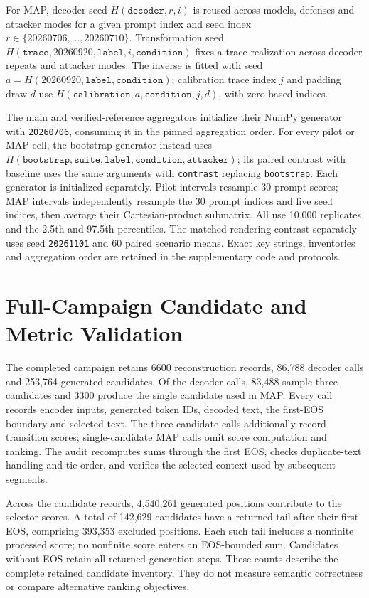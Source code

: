 \documentclass[electronics,article,submit,pdftex,moreauthors]{Definitions/mdpi}
\begin{document}
For MAP, decoder seed $H(\texttt{decoder},r,i)$ is reused across models, defenses and attacker modes for a given prompt index and seed index $r\in\{20260706,\ldots,20260710\}$. Transformation seed $H(\texttt{trace},20260920,\texttt{label},i,\texttt{condition})$ fixes a trace realization across decoder repeats and attacker modes. The inverse is fitted with seed $a=H(20260920,\texttt{label},\texttt{condition})$; calibration trace index $j$ and padding draw $d$ use $H(\texttt{calibration},a,\texttt{condition},j,d)$, with zero-based indices.

The main and verified-reference aggregators initialize their NumPy generator with \texttt{20260706}, consuming it in the pinned aggregation order. For every pilot or MAP cell, the bootstrap generator instead uses $H(\texttt{bootstrap},\texttt{suite},\texttt{label},\texttt{condition},\texttt{attacker})$; its paired contrast with baseline uses the same arguments with \texttt{contrast} replacing \texttt{bootstrap}. Each generator is initialized separately. Pilot intervals resample 30 prompt scores; MAP intervals independently resample the 30 prompt indices and five seed indices, then average their Cartesian-product submatrix. All use 10,000 replicates and the 2.5th and 97.5th percentiles. The matched-rendering contrast separately uses seed \texttt{20261101} and 60 paired scenario means. Exact key strings, inventories and aggregation order are retained in the supplementary code and protocols.

\section{Full-Campaign Candidate and Metric Validation}\label{app:selector}
The completed campaign retains 6600 reconstruction records, 86,788 decoder calls and 253,764 generated candidates. Of the decoder calls, 83,488 sample three candidates and 3300 produce the single candidate used in MAP. Every call records encoder inputs, generated token IDs, decoded text, the first-EOS boundary and selected text. The three-candidate calls additionally record transition scores; single-candidate MAP calls omit score computation and ranking. The audit recomputes sums through the first EOS, checks duplicate-text handling and tie order, and verifies the selected context used by subsequent segments.

Across the candidate records, 4,540,261 generated positions contribute to the selector scores. A total of 142,629 candidates have a returned tail after their first EOS, comprising 393,353 excluded positions. Each such tail includes a nonfinite processed score; no nonfinite score enters an EOS-bounded sum. Candidates without EOS retain all returned generation steps. These counts describe the complete retained candidate inventory. They do not measure semantic correctness or compare alternative ranking objectives.
\end{document}
